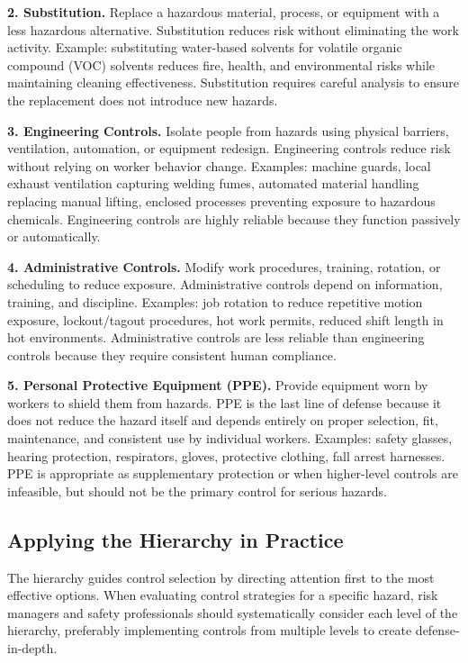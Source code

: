 \documentclass[11pt,openany]{book}
\begin{document}
\textbf{2. Substitution.} Replace a hazardous material, process, or equipment
with a less hazardous alternative. Substitution reduces risk without
eliminating the work activity. Example: substituting water-based solvents for
volatile organic compound (VOC) solvents reduces fire, health, and
environmental risks while maintaining cleaning effectiveness. Substitution
requires careful analysis to ensure the replacement does not introduce new
hazards.

\textbf{3. Engineering Controls.} Isolate people from hazards using physical
barriers, ventilation, automation, or equipment redesign. Engineering controls
reduce risk without relying on worker behavior change. Examples: machine
guards, local exhaust ventilation capturing welding fumes, automated material
handling replacing manual lifting, enclosed processes preventing exposure to
hazardous chemicals. Engineering controls are highly reliable because they
function passively or automatically.

\textbf{4. Administrative Controls.} Modify work procedures, training,
rotation, or scheduling to reduce exposure. Administrative controls depend on
information, training, and discipline. Examples: job rotation to reduce
repetitive motion exposure, lockout/tagout procedures, hot work permits,
reduced shift length in hot environments. Administrative controls are less
reliable than engineering controls because they require consistent human
compliance.

\textbf{5. Personal Protective Equipment (PPE).} Provide equipment worn by
workers to shield them from hazards. PPE is the last line of defense because
it does not reduce the hazard itself and depends entirely on proper selection,
fit, maintenance, and consistent use by individual workers. Examples: safety
glasses, hearing protection, respirators, gloves, protective clothing, fall
arrest harnesses. PPE is appropriate as supplementary protection or when
higher-level controls are infeasible, but should not be the primary control
for serious hazards.

\subsection{Applying the Hierarchy in Practice}

The hierarchy guides control selection by directing attention first to the
most effective options. When evaluating control strategies for a specific
hazard, risk managers and safety professionals should systematically consider
each level of the hierarchy, preferably implementing controls from multiple
levels to create defense-in-depth.
\end{document}
